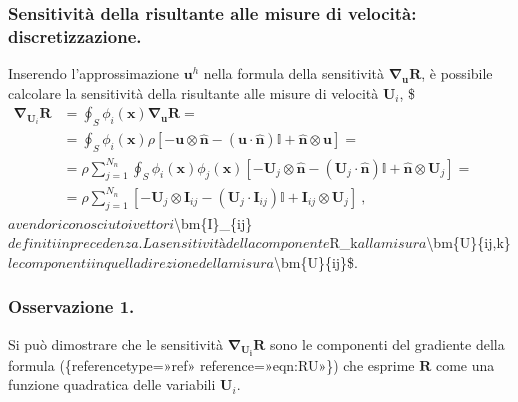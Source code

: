\documentclass[letterpaper,10pt,italian]{jupyterBook}
\begin{document}
\subsubsection{Sensitività della risultante alle misure di velocità: discretizzazione.}
\label{\detokenize{polimi/fluidmechanics-ita/template/capitoli/04_bilanci/0401SciaExp:sensitivita-della-risultante-alle-misure-di-velocita-discretizzazione}}
\sphinxAtStartPar
Inserendo l’approssimazione \(\bm{u}^h\) nella formula della sensitività
\(\bm{\nabla}_{\bm{u}} \bm{R}\), è possibile calcolare la sensitività
della risultante alle misure di velocità \(\bm{U}_i\),
\$\(\label{eqn:sens:RU}
\begin{aligned}
 \bm{\nabla}_{\bm{U}_i} \bm{R} & = \oint_S \phi_i(\bm{x}) \bm{\nabla}_{\bm{u}} \bm{R} =\\
 & = \oint_S \phi_i(\bm{x}) \rho \left[ - \bm{u} \otimes \bm{\hat{n}} - (\bm{u} \cdot \bm{\hat{n}})\mathbb{I} + \bm{\hat{n}} \otimes \bm{u} \right]  = \\
 & = \rho \displaystyle\sum_{j=1}^{N_n} \oint_S \phi_i(\bm{x}) \phi_j(\bm{x}) \left[ - \bm{U}_j \otimes \bm{\hat{n}} - (\bm{U}_j \cdot \bm{\hat{n}})\mathbb{I} + \bm{\hat{n}} \otimes \bm{U}_j \right]  = \\
 & = \rho \displaystyle\sum_{j=1}^{N_n} \left[ - \bm{U}_j \otimes \bm{I}_{ij} - (\bm{U}_j \cdot \bm{I}_{ij})\mathbb{I} + \bm{I}_{ij} \otimes \bm{U}_j \right] \ ,
\end{aligned}\)\( avendo riconosciuto i vettori \)\textbackslash{}bm\{I\}\_\{ij\}\( definiti in
precedenza. La sensitività della componente \)R\_k\( alla misura \)\textbackslash{}bm\{U\}\{ij,k\}\( le componenti in quella direzione della misura \)\textbackslash{}bm\{U\}\{ij\}\$.


\subsubsection{Osservazione 1.}
\label{\detokenize{polimi/fluidmechanics-ita/template/capitoli/04_bilanci/0401SciaExp:osservazione-1}}
\sphinxAtStartPar
Si può dimostrare che le sensitività \(\bm{\nabla}_{\bm{U_i}} \bm{R}\)
sono le componenti del gradiente della formula
(\{reference\sphinxhyphen{}type=»ref» reference=»eqn:RU»\}) che
esprime \(\bm{R}\) come una funzione quadratica delle variabili
\(\bm{U}_i\).
\end{document}
